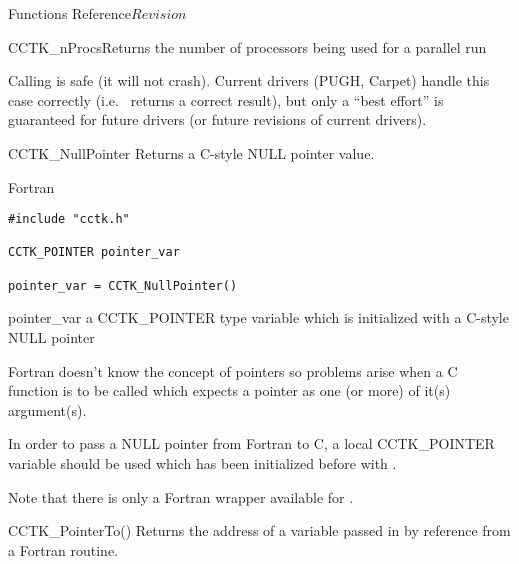 \begin{cactuspart}{ Functions Reference}{}{$Revision$}
\begin{FunctionDescription}{CCTK\_nProcs}{Returns the number of processors being used for a parallel run}
\begin{Discussion}
Calling  is safe (it will not crash).
Current drivers (PUGH, Carpet) handle this case correctly
(i.e.\  returns a correct result), but only
a ``best effort'' is guaranteed for future drivers (or future revisions
of current drivers).
\end{Discussion}
\end{FunctionDescription}


\begin{FunctionDescription}{CCTK\_NullPointer}%
\label{CCTK-NullPointer}
Returns a C-style NULL pointer value.

\begin{SynopsisSection}
\begin{Synopsis}{Fortran}
\begin{verbatim}
#include "cctk.h"

CCTK_POINTER pointer_var

pointer_var = CCTK_NullPointer()
\end{verbatim}
\end{Synopsis}
\end{SynopsisSection}

\begin{ResultSection}
\begin{Result}{pointer\_var}
a CCTK\_POINTER type variable which is initialized with a C-style NULL pointer
\end{Result}
\end{ResultSection}

\begin{Discussion}
Fortran doesn't know the concept of pointers so problems arise when a C function
is to be called which expects a pointer as one (or more) of it(s) argument(s).

In order to pass a NULL pointer from Fortran to C, a local CCTK\_POINTER variable should be used which has been initialized before with .

Note that there is only a Fortran wrapper available for .
\end{Discussion}

\begin{SeeAlsoSection}
\begin{SeeAlso}{CCTK\_PointerTo()}
Returns the address of a variable passed in by reference from a Fortran routine.
\end{SeeAlso}
\end{SeeAlsoSection}


\end{FunctionDescription}
\end{cactuspart}
